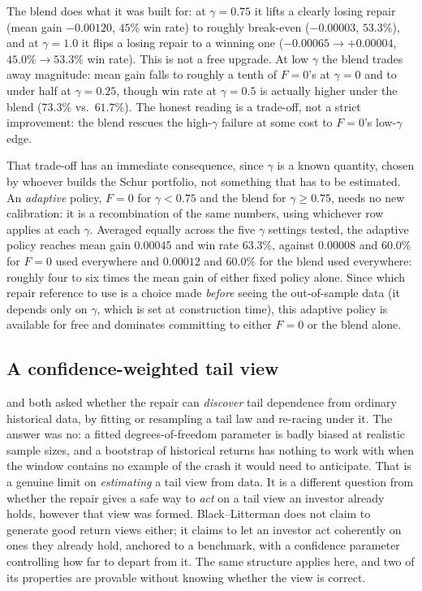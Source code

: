 \documentclass[11pt]{article}
\begin{document}
The blend does what it was built for: at $\gamma=0.75$ it lifts a clearly
losing repair (mean gain $-0.00120$, $45\%$ win rate) to roughly break-even
($-0.00003$, $53.3\%$), and at $\gamma=1.0$ it flips a losing repair to a
winning one ($-0.00065\to+0.00004$, $45.0\%\to53.3\%$ win rate). This is not
a free upgrade. At low $\gamma$ the blend trades away magnitude: mean gain
falls to roughly a tenth of $F=0$'s at $\gamma=0$ and to under half at
$\gamma=0.25$, though win rate at $\gamma=0.5$ is actually higher under the
blend ($73.3\%$ vs.\ $61.7\%$). The honest reading is a trade-off, not a
strict improvement: the blend rescues the high-$\gamma$ failure at some cost
to $F=0$'s low-$\gamma$ edge.

That trade-off has an immediate consequence, since $\gamma$ is a known
quantity, chosen by whoever builds the Schur portfolio, not something that
has to be estimated. An \emph{adaptive} policy, $F=0$ for $\gamma<0.75$ and
the blend for $\gamma\ge0.75$, needs no new calibration: it is a
recombination of the same  numbers, using whichever row
applies at each $\gamma$. Averaged equally across the five $\gamma$ settings
tested, the adaptive policy reaches mean gain $0.00045$ and win rate
$63.3\%$, against $0.00008$ and $60.0\%$ for $F=0$ used everywhere and
$0.00012$ and $60.0\%$ for the blend used everywhere: roughly four to six
times the mean gain of either fixed policy alone. Since which repair
reference to use is a choice made \emph{before} seeing the out-of-sample
data (it depends only on $\gamma$, which is set at construction time), this
adaptive policy is available for free and dominates committing to either
$F=0$ or the blend alone.

\subsection{A confidence-weighted tail view}
\label{sec:tailbelief}

 and  both asked whether the
repair can \emph{discover} tail dependence from ordinary historical data,
by fitting or resampling a tail law and re-racing under it. The answer was
no: a fitted degrees-of-freedom parameter is badly biased at realistic
sample sizes, and a bootstrap of historical returns has nothing to work
with when the window contains no example of the crash it would need to
anticipate. That is a genuine limit on \emph{estimating} a tail view from
data. It is a different question from whether the repair gives a safe way
to \emph{act} on a tail view an investor already holds, however that view
was formed. Black--Litterman does not claim to generate good return
views either; it claims to let an investor act coherently on ones they
already hold, anchored to a benchmark, with a confidence parameter
controlling how far to depart from it. The same structure applies here,
and two of its properties are provable without knowing whether the view is
correct.
\end{document}
